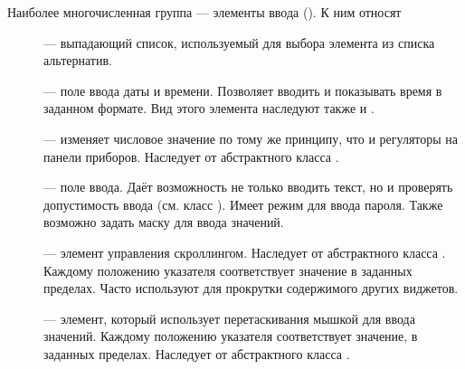 Наиболее многочисленная группа --- элементы ввода (). 
К ним относят 
\begin{description}
\item[] ---
выпадающий список, используемый для выбора элемента из списка
альтернатив. 
\item[] --- поле  ввода даты и времени.
Позволяет вводить и показывать время в заданном формате. Вид этого элемента наследуют также  и .
\item[] --- изменяет числовое значение по тому же
принципу, что и регуляторы на панели приборов. Наследует от абстрактного класса .
\item[] --- поле ввода. Даёт возможность не только вводить текст, но и
проверять допустимость ввода (см. класс ). Имеет режим для ввода пароля. Также возможно задать маску для
ввода значений.
\item[] --- элемент управления скроллингом.
Наследует от абстрактного класса . Каждому положению указателя соответствует значение в заданных
пределах. Часто используют для прокрутки содержимого других виджетов.
\item[] --- элемент, который использует
перетаскивания мышкой для ввода значений. Каждому положению указателя соответствует значение, в заданных пределах.
Наследует от абстрактного класса . 
\end{description}

